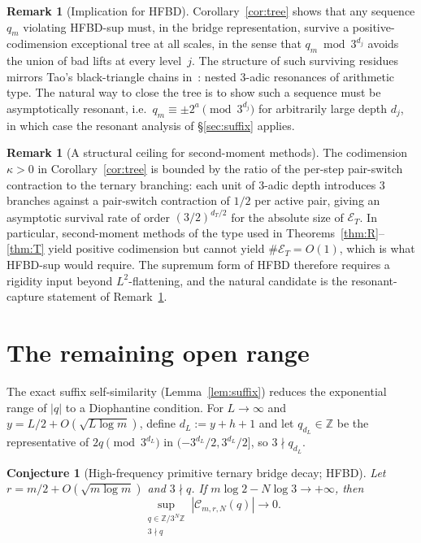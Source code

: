 \documentclass[11pt,a4paper]{amsart}
\theoremstyle{plain}
\newtheorem{conjecture}[theorem]{Conjecture}
\theoremstyle{definition}
\newtheorem{remark}[theorem]{Remark}
\newcommand{\Z}{\mathbb{Z}}
\begin{document}
\begin{remark}[Implication for HFBD]\label{rem:hfbd}
Corollary~\ref{cor:tree} shows that any sequence $q_m$ violating
HFBD-sup must, in the bridge representation, survive a positive-codimension
exceptional tree at all scales, in the sense that
$q_m\bmod 3^{d_j}$ avoids the union of bad lifts at every level~$j$.
The structure of such surviving residues mirrors Tao's black-triangle
chains in~\cite[\S7]{Tao}: nested $3$-adic resonances of arithmetic type.
The natural way to close the tree is to show such a sequence must be
asymptotically resonant, i.e.\ $q_m\equiv\pm 2^a\pmod{3^{d_j}}$
for arbitrarily large depth $d_j$, in which case the resonant analysis
of \S\ref{sec:suffix} applies.
\end{remark}

\begin{remark}[A structural ceiling for second-moment methods]\label{rem:ceiling}
The codimension $\kappa>0$ in Corollary~\ref{cor:tree} is bounded by
the ratio of the per-step pair-switch contraction to the ternary branching:
each unit of $3$-adic depth introduces $3$ branches against a pair-switch
contraction of $1/2$ per active pair, giving an asymptotic survival rate of
order $(3/2)^{d_T/2}$ for the absolute size of $\mathcal E_T$.
In particular, second-moment methods of the type used in
Theorems~\ref{thm:R}--\ref{thm:T} yield positive codimension but cannot
yield $\#\mathcal E_T=O(1)$, which is what HFBD-sup would require.
The supremum form of HFBD therefore requires a rigidity input beyond
$L^2$-flattening, and the natural candidate is the resonant-capture
statement of Remark~\ref{rem:hfbd}.
\end{remark}

\section{The remaining open range}\label{sec:open}

The exact suffix self-similarity (Lemma~\ref{lem:suffix}) reduces the
exponential range of $|q|$ to a Diophantine condition.
For $L\to\infty$ and $y=L/2+O(\sqrt{L\log m})$, define
$d_L:=y+h+1$ and let $q_{d_L}\in\Z$ be the representative of
$2q\pmod{3^{d_L}}$ in $(-3^{d_L}/2,3^{d_L}/2]$, so $3\nmid q_{d_L}$.

\begin{conjecture}[High-frequency primitive ternary bridge decay; HFBD]\label{conj:HFBD}
Let $r=m/2+O(\sqrt{m\log m})$ and $3\nmid q$.
If $m\log 2-N\log 3\to+\infty$, then
$$
\sup_{\substack{q\in\Z/3^N\Z\\3\nmid q}}
|\mathcal C_{m,r,N}(q)|\to0.
$$
\end{conjecture}
\end{document}
